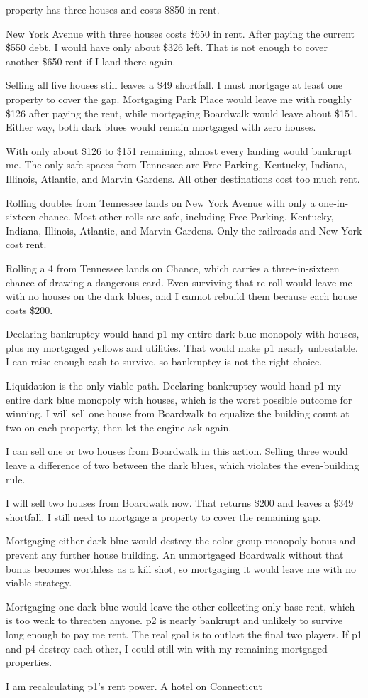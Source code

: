 property has three houses and costs \$850 in rent.\par New York Avenue with three houses costs \$650 in rent. After paying the current \$550 debt, I would have only about \$326 left. That is not enough to cover another \$650 rent if I land there again.\par Selling all five houses still leaves a \$49 shortfall. I must mortgage at least one property to cover the gap. Mortgaging Park Place would leave me with roughly \$126 after paying the rent, while mortgaging Boardwalk would leave about \$151. Either way, both dark blues would remain mortgaged with zero houses.\par With only about \$126 to \$151 remaining, almost every landing would bankrupt me. The only safe spaces from Tennessee are Free Parking, Kentucky, Indiana, Illinois, Atlantic, and Marvin Gardens. All other destinations cost too much rent.\par Rolling doubles from Tennessee lands on New York Avenue with only a one-in-sixteen chance. Most other rolls are safe, including Free Parking, Kentucky, Indiana, Illinois, Atlantic, and Marvin Gardens. Only the railroads and New York cost rent.\par Rolling a 4 from Tennessee lands on Chance, which carries a three-in-sixteen chance of drawing a dangerous card. Even surviving that re-roll would leave me with no houses on the dark blues, and I cannot rebuild them because each house costs \$200.\par Declaring bankruptcy would hand p1 my entire dark blue monopoly with houses, plus my mortgaged yellows and utilities. That would make p1 nearly unbeatable. I can raise enough cash to survive, so bankruptcy is not the right choice.\par Liquidation is the only viable path. Declaring bankruptcy would hand p1 my entire dark blue monopoly with houses, which is the worst possible outcome for winning. I will sell one house from Boardwalk to equalize the building count at two on each property, then let the engine ask again.\par I can sell one or two houses from Boardwalk in this action. Selling three would leave a difference of two between the dark blues, which violates the even-building rule.\par I will sell two houses from Boardwalk now. That returns \$200 and leaves a \$349 shortfall. I still need to mortgage a property to cover the remaining gap.\par Mortgaging either dark blue would destroy the color group monopoly bonus and prevent any further house building. An unmortgaged Boardwalk without that bonus becomes worthless as a kill shot, so mortgaging it would leave me with no viable strategy.\par Mortgaging one dark blue would leave the other collecting only base rent, which is too weak to threaten anyone. p2 is nearly bankrupt and unlikely to survive long enough to pay me rent. The real goal is to outlast the final two players. If p1 and p4 destroy each other, I could still win with my remaining mortgaged properties.\par I am recalculating p1's rent power. A hotel on Connecticut 